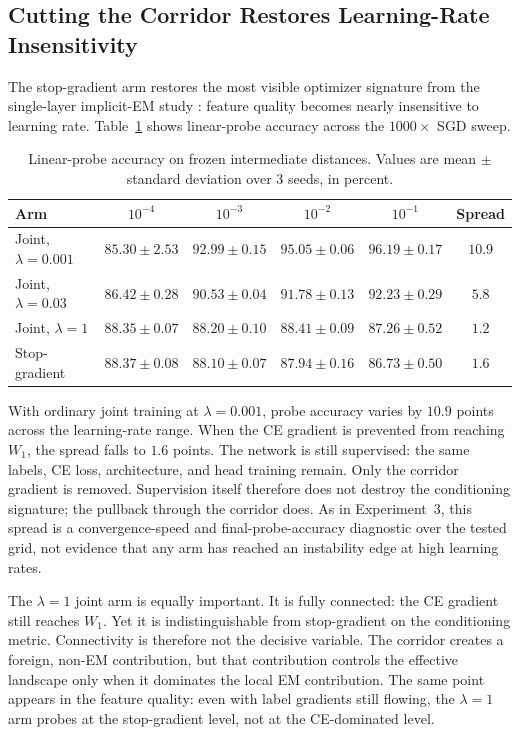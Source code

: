 \subsection{Cutting the Corridor Restores Learning-Rate Insensitivity}
The stop-gradient arm restores the most visible optimizer signature from the
single-layer implicit-EM study \citep{oursland2026decoderfree}: feature quality
becomes nearly insensitive to learning rate. Table~\ref{tab:exp4-probe} shows
linear-probe accuracy across the $1000\times$ SGD sweep.
\begin{table}[h]
\centering
\begin{tabular}{lccccc}
\toprule
Arm & $10^{-4}$ & $10^{-3}$ & $10^{-2}$ & $10^{-1}$ & Spread \\
\midrule
Joint, $\lambda=0.001$ &
$85.30\pm2.53$ & $92.99\pm0.15$ & $95.05\pm0.06$ & $96.19\pm0.17$ &
$10.9$ \\
Joint, $\lambda=0.03$ &
$86.42\pm0.28$ & $90.53\pm0.04$ & $91.78\pm0.13$ & $92.23\pm0.29$ &
$5.8$ \\
Joint, $\lambda=1$ &
$88.35\pm0.07$ & $88.20\pm0.10$ & $88.41\pm0.09$ & $87.26\pm0.52$ &
$1.2$ \\
Stop-gradient &
$88.37\pm0.08$ & $88.10\pm0.07$ & $87.94\pm0.16$ & $86.73\pm0.50$ &
$1.6$ \\
\bottomrule
\end{tabular}
\caption{Linear-probe accuracy on frozen intermediate distances. Values are
mean $\pm$ standard deviation over 3 seeds, in percent.}
\label{tab:exp4-probe}
\end{table}
With ordinary joint training at $\lambda=0.001$, probe accuracy varies by
$10.9$ points across the learning-rate range. When the CE gradient is
prevented from reaching $W_1$, the spread falls to $1.6$ points. The network
is still supervised: the same labels, CE loss, architecture, and head training
remain. Only the corridor gradient is removed. Supervision itself therefore
does not destroy the conditioning signature; the pullback through the corridor
does. As in Experiment~3, this spread is a convergence-speed and
final-probe-accuracy diagnostic over the tested grid, not evidence that any
arm has reached an instability edge at high learning rates.

The $\lambda=1$ joint arm is equally important. It is fully connected: the CE
gradient still reaches $W_1$. Yet it is indistinguishable from stop-gradient
on the conditioning metric. Connectivity is therefore not the decisive
variable. The corridor creates a foreign, non-EM contribution, but that
contribution controls the effective landscape only when it dominates the local
EM contribution. The same point appears in the feature quality: even with
label gradients still flowing, the $\lambda=1$ arm probes at the stop-gradient
level, not at the CE-dominated level.

